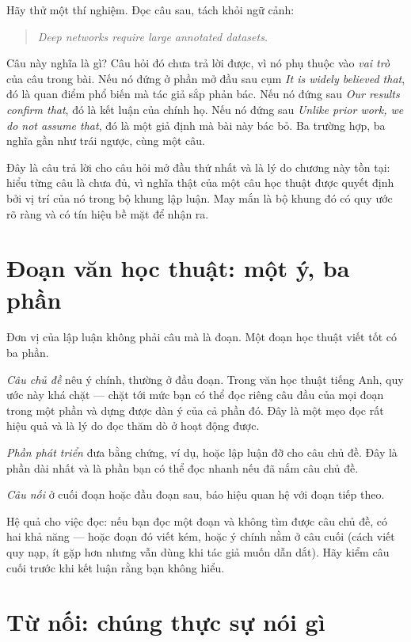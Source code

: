 \documentclass[../../english.tex]{subfiles}
\begin{document}
Hãy thử một thí nghiệm. Đọc câu sau, tách khỏi ngữ cảnh:

\begin{quote}
\emph{Deep networks require large annotated datasets.}
\end{quote}

Câu này nghĩa là gì? Câu hỏi đó chưa trả lời được, vì nó phụ thuộc vào \emph{vai trò} của câu trong bài. Nếu nó đứng ở phần mở đầu sau cụm \emph{It is widely believed that}, đó là quan điểm phổ biến mà tác giả sắp phản bác. Nếu nó đứng sau \emph{Our results confirm that}, đó là kết luận của chính họ. Nếu nó đứng sau \emph{Unlike prior work, we do not assume that}, đó là một giả định mà bài này bác bỏ. Ba trường hợp, ba nghĩa gần như trái ngược, cùng một câu.

Đây là câu trả lời cho câu hỏi mở đầu thứ nhất và là lý do chương này tồn tại: hiểu từng câu là chưa đủ, vì nghĩa thật của một câu học thuật được quyết định bởi vị trí của nó trong bộ khung lập luận. May mắn là bộ khung đó có quy ước rõ ràng và có tín hiệu bề mặt để nhận ra.

\section{Đoạn văn học thuật: một ý, ba phần}

Đơn vị của lập luận không phải câu mà là đoạn. Một đoạn học thuật viết tốt có ba phần.

\emph{Câu chủ đề} nêu ý chính, thường ở đầu đoạn. Trong văn học thuật tiếng Anh, quy ước này khá chặt --- chặt tới mức bạn có thể đọc riêng câu đầu của mọi đoạn trong một phần và dựng được dàn ý của cả phần đó. Đây là một mẹo đọc rất hiệu quả và là lý do đọc thăm dò ở  hoạt động được.

\emph{Phần phát triển} đưa bằng chứng, ví dụ, hoặc lập luận đỡ cho câu chủ đề. Đây là phần dài nhất và là phần bạn có thể đọc nhanh nếu đã nắm câu chủ đề.

\emph{Câu nối} ở cuối đoạn hoặc đầu đoạn sau, báo hiệu quan hệ với đoạn tiếp theo.

Hệ quả cho việc đọc: nếu bạn đọc một đoạn và không tìm được câu chủ đề, có hai khả năng --- hoặc đoạn đó viết kém, hoặc ý chính nằm ở câu cuối (cách viết quy nạp, ít gặp hơn nhưng vẫn dùng khi tác giả muốn dẫn dắt). Hãy kiểm câu cuối trước khi kết luận rằng bạn không hiểu.

\section{Từ nối: chúng thực sự nói gì}
\end{document}
